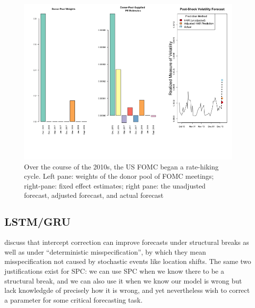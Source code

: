 \documentclass[11pt]{article}
\theoremstyle{definition}
\begin{document}
\begin{figure}[h!]
  \begin{center}
    \includegraphics[scale=.4]{real_data_output_plots/savetime_SatJun151644072024__^VIX-^IRX-^XAU_^VIX_2018-12-18-2015-12-15-2016-12-13-2017-03-14-2017-06-13-2017-12-12-2018-03-20-2018-06-12-2018-09-25.png}
    \caption{Over the course of the 2010s, the US FOMC began a rate-hiking cycle.  Left pane: weights of the donor pool of FOMC meetings; right-pane: fixed effect estimates; right pane: the unadjusted forecast, adjusted forecast, and actual forecast}
    \label{fig:six_plots}
    \end{center}
  \end{figure}

\subsection{LSTM/GRU}

\cite{hendry2004pooling} discuss that intercept correction can improve forecasts under structural breaks as well as under ``deterministic misspecification'', by which they mean misspecification not caused by stochastic events like location shifts.  The same two justifications exist for SPC: we can use SPC when we know there to be a structural break, and we can also use it when we know our model is wrong but lack knowledgde of precisely how it is wrong, and yet nevertheless wish to correct a parameter for some critical forecasting task.
\end{document}
